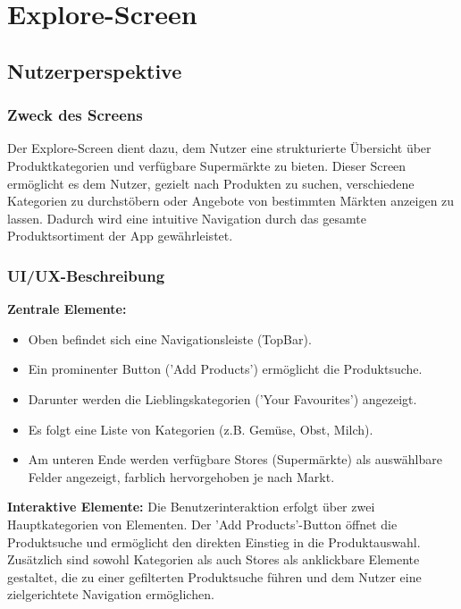 \documentclass[12pt, a4paper]{report} %
\begin{document}
\section{Explore-Screen}
\label{sec:explore_screen}

\subsection{Nutzerperspektive}

\subsubsection{Zweck des Screens}
Der Explore-Screen dient dazu, dem Nutzer eine strukturierte Übersicht über Produktkategorien und verfügbare Supermärkte zu bieten. Dieser Screen ermöglicht es dem Nutzer, gezielt nach Produkten zu suchen, verschiedene Kategorien zu durchstöbern oder Angebote von bestimmten Märkten anzeigen zu lassen. Dadurch wird eine intuitive Navigation durch das gesamte Produktsortiment der App gewährleistet.

\subsubsection{UI/UX-Beschreibung}

\textbf{Zentrale Elemente:}
\begin{itemize}
    \item Oben befindet sich eine Navigationsleiste (TopBar).
    \item Ein prominenter Button ('Add Products') ermöglicht die Produktsuche.
    \item Darunter werden die Lieblingskategorien ('Your Favourites') angezeigt.
    \item Es folgt eine Liste von Kategorien (z.B. Gemüse, Obst, Milch).
    \item Am unteren Ende werden verfügbare Stores (Supermärkte) als auswählbare Felder angezeigt, farblich hervorgehoben je nach Markt.
\end{itemize}

\noindent\textbf{Interaktive Elemente:}
Die Benutzerinteraktion erfolgt über zwei Hauptkategorien von Elementen. Der 'Add Products'-Button öffnet die Produktsuche und ermöglicht den direkten Einstieg in die Produktauswahl. Zusätzlich sind sowohl Kategorien als auch Stores als anklickbare Elemente gestaltet, die zu einer gefilterten Produktsuche führen und dem Nutzer eine zielgerichtete Navigation ermöglichen.
\end{document}
